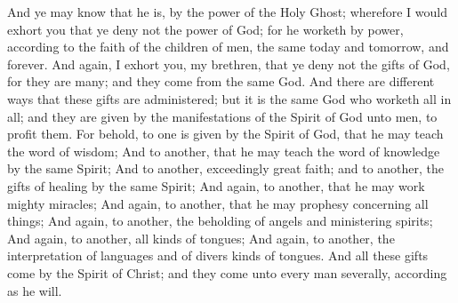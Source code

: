 And ye may know that he is, by the power of the Holy Ghost; wherefore I would exhort you that ye deny not the power of God; for he worketh by power, according to the faith of the children of men, the same today and tomorrow, and forever.
\bverse \iffalse And again, I exhort you, my brethren, that ye deny not the gifts of God, for they are many; and they come from the same God.  And there are different ways that these gifts are administered; but it is the same God who worketh all in all; and they are given by the manifestations of the Spirit of God unto men, to profit them. \fi
And again, I exhort you, my brethren, that ye deny not the gifts of God, for they are many; and they come from the same God.  And there are different ways that these gifts are administered; but it is the same God who worketh all in all; and they are given by the manifestations of the Spirit of God unto men, to profit them.
\bverse \iffalse For behold, to one is given by the Spirit of God, that he may teach the word of wisdom; \fi
For behold, to one is given by the Spirit of God, that he may teach the word of wisdom;
\bverse \iffalse And to another, that he may teach the word of knowledge by the same Spirit; \fi
And to another, that he may teach the word of knowledge by the same Spirit;
\bverse \iffalse And to another, exceedingly great faith; and to another, the gifts of healing by the same Spirit; \fi
And to another, exceedingly great faith; and to another, the gifts of healing by the same Spirit;
\bverse \iffalse And again, to another, that he may work mighty miracles; \fi
And again, to another, that he may work mighty miracles;
\bverse \iffalse And again, to another, that he may prophesy concerning all things; \fi
And again, to another, that he may prophesy concerning all things;
\bverse \iffalse And again, to another, the beholding of angels and ministering spirits; \fi
And again, to another, the beholding of angels and ministering spirits;
\bverse \iffalse And again, to another, all kinds of tongues; \fi
And again, to another, all kinds of tongues;
\bverse \iffalse And again, to another, the interpretation of languages and of divers kinds of tongues. \fi
And again, to another, the interpretation of languages and of divers kinds of tongues.
\bverse \iffalse And all these gifts come by the Spirit of Christ; and they come unto every man severally, according as he will. \fi
And all these gifts come by the Spirit of Christ; and they come unto every man severally, according as he will.
